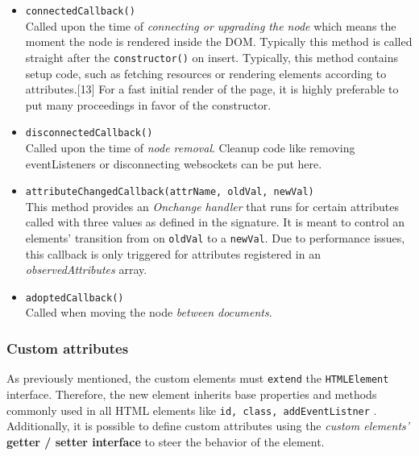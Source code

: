 \documentclass[]{article}
\providecommand{\tightlist}{%
  \setlength{\itemsep}{0pt}\setlength{\parskip}{0pt}}
\begin{document}
\begin{itemize}
\tightlist
\item
  \texttt{connectedCallback()}\\
  Called upon the time of \emph{connecting or upgrading the node} which
  means the moment the node is rendered inside the DOM. Typically this
  method is called straight after the \texttt{constructor()} on insert.
  Typically, this method contains setup code, such as fetching resources
  or rendering elements according to attributes.{[}13{]} For a fast
  initial render of the page, it is highly preferable to put many
  proceedings in favor of the constructor.
\item
  \texttt{disconnectedCallback()}\\
  Called upon the time of \emph{node removal}. Cleanup code like
  removing eventListeners or disconnecting websockets can be put here.
\item
  \texttt{attributeChangedCallback(attrName,\ oldVal,\ newVal)}\\
  This method provides an \emph{Onchange handler} that runs for certain
  attributes called with three values as defined in the signature. It is
  meant to control an elements' transition from on \texttt{oldVal} to a
  \texttt{newVal}. Due to performance issues, this callback is only
  triggered for attributes registered in an \emph{observedAttributes}
  array.
\item
  \texttt{adoptedCallback()}\\
  Called when moving the node \emph{between documents}.
\end{itemize}

\subsubsection{Custom attributes}\label{custom-attributes}

As previously mentioned, the custom elements must \texttt{extend} the
\texttt{HTMLElement} interface. Therefore, the new element inherits base
properties and methods commonly used in all HTML elements like
\texttt{id,\ class,\ addEventListner} . Additionally, it is possible to
define custom attributes using the \emph{custom elements'}
\textbf{getter / setter interface} to steer the behavior of the element.
\end{document}
